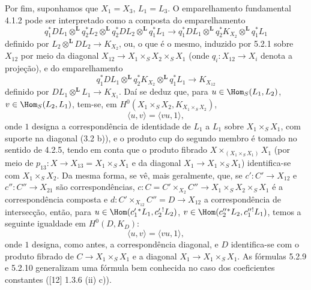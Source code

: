 Por fim, suponhamos que $X_1=X_3$, $L_1=L_3$. O emparelhamento fundamental 4.1.2 pode ser interpretado como a composta do emparelhamento
\begin{equation}
\tag{5.2.7}
q_1^*DL_1\otimes^{\mathbf L}q_2^*L_2\otimes^{\mathbf L}q_2^*DL_2\otimes^{\mathbf L}q_1^*L_1
\longrightarrow
q_1^*DL_1\otimes^{\mathbf L}q_2^*K_{X_2}\otimes^{\mathbf L}q_1^*L_1
\end{equation}
definido por $L_2\otimes^{\mathbf L}DL_2\to K_{X_2}$, ou, o que é o mesmo, induzido por 5.2.1 sobre $X_{12}$ por meio da diagonal $X_{12}\to X_1\times_SX_2\times_SX_1$ (onde $q_i:X_{12}\to X_i$ denota a projeção), e do emparelhamento
\begin{equation}
\tag{5.2.8}
q_1^*DL_1\otimes^{\mathbf L}q_2^*K_{X_2}\otimes^{\mathbf L}q_1^*L_1\longrightarrow K_{X_{12}}
\end{equation}
definido por $DL_1\otimes^{\mathbf L}L_1\to K_{X_1}$. Daí se deduz que, para $u\in\Hom_S(L_1,L_2)$, $v\in\Hom_S(L_2,L_1)$, tem-se, em $H^0(X_1\times_SX_2,K_{X_1\times_SX_2})$,
\begin{equation}
\tag{5.2.9}
\langle u,v\rangle=\langle vu,1\rangle,
\end{equation}
onde $1$ designa a correspondência de identidade de $L_1$ a $L_1$ sobre $X_1\times_SX_1$, com suporte na diagonal (3.2 b)), e o produto cup do segundo membro é tomado no sentido de 4.2.5, tendo em conta que o produto fibrado $X\times_{(X_1\times_SX_1)}X_1$ (por meio de $p_{13}:X\to X_{13}=X_1\times_SX_1$ e da diagonal $X_1\to X_1\times_SX_1$) identifica-se com $X_1\times_SX_2$. Da mesma forma, se vê, mais geralmente, que, se $c':C'\to X_{12}$ e $c'':C''\to X_{21}$ são correspondências, $c:C=C'\times_{X_2}C''\to X_1\times_SX_2\times_SX_1$ é a correspondência composta e $d:C'\times_{X_{12}}C''=D\to X_{12}$ a correspondência de intersecção, então, para $u\in\Hom(c_1'{}^*L_1,c_2'{}^!L_2)$, $v\in\Hom(c_2''{}^*L_2,c_1''{}^!L_1)$, temos a seguinte igualdade em $H^0(D,K_D)$:
\begin{equation}
\tag{5.2.10}
\langle u,v\rangle=\langle vu,1\rangle,
\end{equation}
onde $1$ designa, como antes, a correspondência diagonal, e $D$ identifica-se com o produto fibrado de $C\to X_1\times_SX_1$ e a diagonal $X_1\to X_1\times_SX_1$. As fórmulas 5.2.9 e 5.2.10 generalizam uma fórmula bem conhecida no caso dos coeficientes constantes ([12] 1.3.6 (ii) c)).

